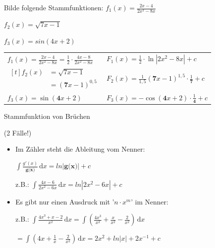 \documentclass[paper=a6,landscape,ngerman,twoside=true,fontsize=12pt]{scrartcl}
\begin{document}
\begin{frage}
	Bilde folgende Stammfunktionen: 
	\flushleft 
	$f_1(x)=\frac{2x-4}{2x^2-8x}$
	
	\bigskip
	$f_2(x)=\sqrt{7x-1}$
	
	\bigskip
	$f_3(x)=sin(4x+2)$	
\end{frage}
\begin{antwort}
\begin{center}
	\large
	\begin{tabularx}{\textwidth}{>{\raggedright\arraybackslash}X | >{\raggedright\arraybackslash}X}
		\multicolumn{1}{c|}{$f(x)$} & \multicolumn{1}{c}{$F(x)$} \\
		\hline
		$f_1(x)=\frac{2x-4}{2x^2-8x}=\frac{1}{2}\cdot\frac{4x-8}{2x^2-8x}$ & $F_1(x)=\frac{1}{2}\cdot \ln|2x^2-8x|+c$ \\[3ex]
		
		$\begin{aligned}[t]
			f_2(x) &= \sqrt{7x-1} \\
			&= (\mathbf{7}x-1)^{0,5}
		\end{aligned}$ & $F_2(x)=\frac{1}{1,5}(\mathbf{7}x-1)^{1,5}\cdot\frac{1}{\mathbf{7}}+c$ \\[3ex]
		
		$f_3(x)=\sin(\mathbf{4}x+2)$ & $F_3(x)=-\cos(\mathbf{4}x+2)\cdot\frac{1}{\mathbf{4}}+c$ \\
	\end{tabularx}
\end{center}
\end{antwort}
\begin{frage}
	Stammfunktion von Brüchen
	
	(2 Fälle!)
\end{frage}
\begin{antwort}
\normalsize\begin{itemize}
	\item Im Zähler steht die Ableitung vom Nenner:
	
	$\displaystyle\int \! \frac{g'(x)}{\textbf{g(x)}} \, \mathrm{d}x=ln|\textbf{g(x)}|+c$
	
	z.B.: $\displaystyle\int \! \frac{4x-6}{{2x^2-6x}} \, \mathrm{d}x=ln|{2x^2-6x}|+c$
	\item Es gibt nur einen Ausdruck mit '$n \cdot x^m$' im Nenner:
	
	 z.B.: $\displaystyle\int \! \frac{4x^3+x-2}{{x^2}} \, \mathrm{d}x=\displaystyle\int \! (\frac{4x^3}{{x^2}}+\frac{x}{{x^2}}-\frac{2}{{x^2}}) \, \mathrm{d}x$
	 
	 $=\displaystyle\int \! (4x+\frac{1}{{x}}-\frac{2}{{x^2}}) \, \mathrm{d}x=\displaystyle 2x^2+ln|x|+2x^{-1}+c$
	\end{itemize}
\end{antwort}
\end{document}
